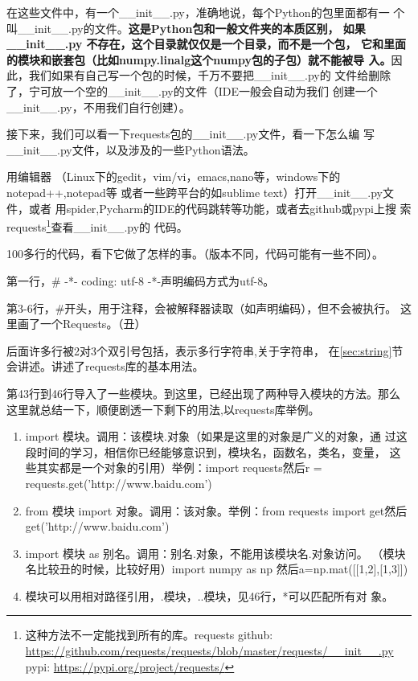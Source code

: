 \documentclass[11pt,UTF8,oneside]{mybook}
\begin{document}
在这些文件中，有一个\_\_init\_\_.py，准确地说，每个Python的包里面都有一
个叫\_\_init\_\_.py的文件。\textbf{这是Python包和一般文件夹的本质区别，
  如果 \_\_init\_\_.py 不存在，这个目录就仅仅是一个目录，而不是一个包，
  它和里面的模块和嵌套包（比如numpy.linalg这个numpy包的子包）就不能被导
  入。}因此，我们如果有自己写一个包的时候，千万不要把\_\_init\_\_.py的
文件给删除了，宁可放一个空的\_\_init\_\_.py的文件（IDE一般会自动为我们
创建一个\_\_init\_\_.py，不用我们自行创建）。

接下来，我们可以看一下requests包的\_\_init\_\_.py文件，看一下怎么编
写\_\_init\_\_.py文件，以及涉及的一些Python语法。

用编辑器
（Linux下的gedit，vim/vi，emacs,nano等，windows下的notepad++,notepad等
或者一些跨平台的如sublime text）打开\_\_init\_\_.py文件，或者
用spider,Pycharm的IDE的代码跳转等功能，或者去github或pypi上搜
索requests\footnote{这种方法不一定能找到所有的库。requests github:
  \url{https://github.com/requests/requests/blob/master/requests/__init__.py}
  pypi: \url{https://pypi.org/project/requests/}}查看\_\_init\_\_.py的
代码。


100多行的代码，看下它做了怎样的事。（版本不同，代码可能有一些不同）。

第一行，\# -*- coding: utf-8 -*-声明编码方式为utf-8。

第3-6行，\#开头，用于注释，会被解释器读取（如声明编码），但不会被执行。
这里画了一个Requests。（丑）

后面许多行被2对3个双引号包括，表示多行字符串,关于字符串，
在\autoref{sec:string}节会讲述。讲述了requests库的基本用法。

第43行到46行导入了一些模块。到这里，已经出现了两种导入模块的方法。那么
这里就总结一下，顺便剧透一下剩下的用法,以requests库举例。

\begin{enumerate}[1)]
\item import 模块。调用：该模块.对象（如果是这里的对象是广义的对象，通
  过这段时间的学习，相信你已经能够意识到，模块名，函数名，类名，变量，
  这些其实都是一个对象的引用）举例：import requests然后r =
  requests.get('http://www.baidu.com')
\item from 模块 import 对象。调用：该对象。举例：from requests import
  get然后get('http://www.baidu.com')
\item import 模块 as 别名。调用：别名.对象，不能用该模块名.对象访问。
  （模块名比较丑的时候，比较好用）import numpy as
  np 然后a=np.mat([[1,2],[1,3]])
\item 模块可以用相对路径引用，.模块，..模块，见46行，*可以匹配所有对
  象。
\end{enumerate}
\end{document}
